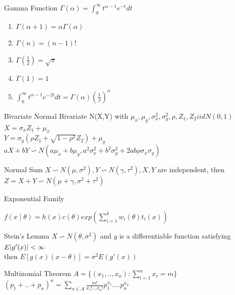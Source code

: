 \documentclass{article}
\begin{document}
\begin{multicols*}{3}
\begin{thmbox}{Gamma Function}
$\Gamma(\alpha) = \int^{\infty}_{0}t^{\alpha - 1}e^{-t}dt$
\begin{enumerate}
\item [1.]$\Gamma(\alpha + 1) = \alpha\Gamma(\alpha)$
\item [2.] $\Gamma(n) = (n-1)!$
\item [3.] $\Gamma(\frac{1}{2}) = \sqrt{\pi}$
\item [4.] $\Gamma(1) = 1$
\item[5.] $\int^{\infty}_{0} t^{\alpha - 1} e^{-\beta t} dt = \Gamma(\alpha)(\frac{1}{\beta})^{\alpha}$
\end{enumerate}
\end{thmbox}

\begin{thmbox}{Bivariate Normal}
Bivariate N(X,Y) with $\mu_x,\mu_y,\sigma^2_x, \sigma^2_y, \rho , Z_1,Z_2 iid N(0,1)$\\
$X = \sigma_{x}Z_1 + \mu_x$\\
$Y = \sigma_y(\rho Z_1 + \sqrt{1-\rho^2}Z_2)+\mu_y$ \\
$aX + bY \backsim N(a\mu_x +b\mu_y, a^2\sigma^2_x + b^2\sigma_y^2 + 2ab\rho\sigma_x\sigma_y)$
\end{thmbox}

\begin{thmbox}{Normal Sum}
$X \backsim N(\mu, \sigma^2), Y \backsim N(\gamma, \tau^2), X,Y $ are independent, then
$Z = X + Y \backsim N(\mu + \gamma, \sigma^2 + \tau^2)$
\end{thmbox}

\begin{thmbox}{Exponential Family}

$f(x\mid \theta) = h(x)c(\theta)exp(\sum^{k}_{i=1}w_i(\theta)t_i(x))$
\end{thmbox}

\begin{thmbox}{Stein's Lemma}
$X \backsim N(\theta,\sigma^2)$ and $g$ is a differentiable function satisfying $E\arrowvert g'(x)\arrowvert < \infty$ \\ 
then $E[g(x)(x-\theta)] = \sigma^2E(g'(x))$
\end{thmbox}

\begin{thmbox}{Multinomial Theorem}
$ A = \{(x_1,..,x_n):\sum^{n}_{i=1}x_i = m\}$\\
$(p_1 + ..+p_n)^n = \sum_{x \in A} \frac{m!}{x_1!...x_n!}p_1^{x_1}....p_n^{x_n}$
\end{thmbox}


\end{multicols*}
\end{document}
